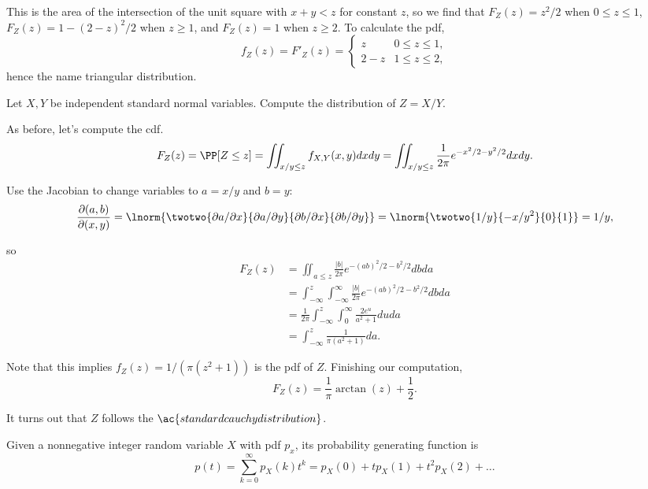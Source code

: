 This is the area of the intersection of the unit square with $x+y<z$ for constant $z$, so we find that $F_Z(z) = z^2/2$ when $0\leq z\leq 1$, $F_Z(z) = 1 - (2-z)^2/2$ when $z\geq 1$, and $F_Z(z) = 1$ when $z\geq 2$. To calculate the pdf, 
\[f_Z(z) = F'_Z(z) = \begin{cases}z & 0\leq z\leq 1,\\ 2-z & 1\leq z\leq 2,\end{cases}\] 
hence the name triangular distribution.

\begin{example}
\exlabel

Let $X,Y$ be independent standard normal variables. Compute the distribution of $Z = X/Y$. 
\end{example}

As before, let's compute the cdf. 
\[F_Z(z) = \PP[Z\leq z] = \iint_{x/y\leq z} f_{X,Y}(x,y) dxdy = \iint_{x/y\leq z}\frac{1}{2\pi}e^{-x^2/2-y^2/2}dxdy.\]

Use the Jacobian to change variables to $a = x/y$ and $b=y$:
\[\frac{\partial{(a, b)}}{\partial{(x, y)}} = \lnorm{\twotwo{\partial a/\partial x}{\partial a/\partial y}{\partial b/\partial x}{\partial b/\partial y}} = \lnorm{\twotwo{1/y}{-x/y^2}{0}{1}} = 1/y,\]

so
\begin{align*}
    F_Z(z) &= \iint_{a\leq z}\frac{\vert b\vert}{2\pi}e^{-(ab)^2/2 - b^2/2}dbda \\
    &= \int_{-\infty}^z \int_{-\infty}^{\infty}\frac{\vert b\vert}{2\pi}e^{-(ab)^2/2 - b^2/2}dbda \\
    &= \frac{1}{2\pi}\int_{-\infty}^z \int_{0}^{\infty}\frac{2e^u}{a^2+1} duda \\
    &= \int_{-\infty}^{z}\frac{1}{\pi (a^2+1)} da.
\end{align*}

Note that this implies $f_Z(z) = 1/(\pi (z^2+1))$ is the pdf of $Z$. Finishing our computation, 
\[F_Z(z) = \frac{1}{\pi}\arctan{(z)} + \frac{1}{2}.\]

It turns out that $Z$ follows the $\ac{standard cauchy distribution}$.  

\begin{definition}

Given a nonnegative integer random variable $X$ with pdf $p_x$, its \ac{probability generating function} is 
\[p(t) = \sum_{k=0}^{\infty} p_X(k)t^k = p_X(0) + tp_X(1) + t^2p_X(2) + \hdots \]
\end{definition}

